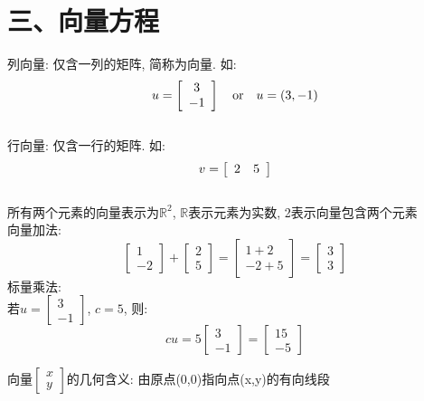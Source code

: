 \section{三、向量方程}
列向量: 仅含一列的矩阵, 简称为向量. 如:
\[u=\left[\begin{array}{c}
	3\\
	-1
\end{array}\right] \text{\quad or\quad} u=(3, -1)\]\\[2ex]
行向量: 仅含一行的矩阵. 如:
\[v=\left[\begin{array}{c c}
	2 & 5
\end{array}\right]\]\\[2ex]
所有两个元素的向量表示为$\mathbb{R}^2$, $\mathbb{R}$表示元素为实数, 2表示向量包含两个元素\\
向量加法:
\begin{equation*}
\left[\begin{array}{c}
	1\\
	-2
\end{array}\right]
+
\left[\begin{array}{c}
	2\\
	5
\end{array}\right]
=
\left[\begin{array}{c}
	1+2\\
	-2+5
\end{array}\right]
=
\left[\begin{array}{c}
	3\\
	3
\end{array}\right]
\end{equation*}
标量乘法:\\
\indent 若$u=\left[\begin{array}{c}3\\-1\end{array}\right]$, $c=5$, 则:
\[cu=5\left[\begin{array}{c}3\\-1\end{array}\right]=\left[\begin{array}{c}15\\-5\end{array}\right]\]

向量$\left[\begin{array}{r}x\\y\end{array}\right]$的几何含义: 由原点(0,0)指向点(x,y)的有向线段\\[2ex]

